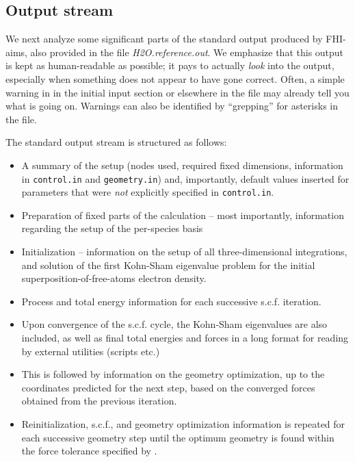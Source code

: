 \subsection*{Output stream}

We next analyze some significant parts of the standard output
produced by FHI-aims, also provided in the file
\emph{H2O.reference.out}. We emphasize that this output is kept as
human-readable as possible; it pays to actually \emph{look} into the
output, especially when something does not appear to have gone
correct. Often, a simple warning in in the initial input section or
elsewhere in the file may already tell you what is going on. Warnings can also
be identified by ``grepping'' for asterisks in the file.

The standard output stream is structured as follows:
\begin{itemize}
  \item A summary of the setup (nodes used, required fixed dimensions,
    information in \texttt{control.in} and \texttt{geometry.in}) and,
    importantly, default values inserted for parameters that were
    \emph{not} explicitly specified in \texttt{control.in}.
  \item Preparation of fixed parts of the calculation -- most
    importantly, information regarding the setup of the per-species
    basis 
  \item Initialization -- information on the setup of all
    three-dimensional integrations, and solution of the first
    Kohn-Sham eigenvalue problem for the initial
    superposition-of-free-atoms electron density.
  \item Process and total energy information for each successive
    s.c.f. iteration.
  \item Upon convergence of the s.c.f. cycle, the Kohn-Sham
    eigenvalues are also included, as well as final total energies and
    forces in a long format for reading by external utilities (scripts
    etc.) 
  \item This is followed by information on the geometry optimization,
    up to the coordinates predicted for the next step, based on the
    converged forces obtained from the previous iteration. 
  \item Reinitialization, s.c.f., and geometry optimization
    information is repeated for each successive geometry step until
    the optimum geometry is found within the force tolerance specified
    by .
\end{itemize}

